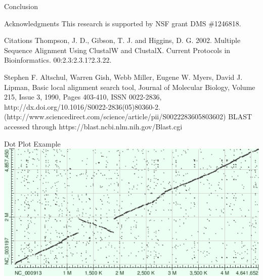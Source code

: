 \documentclass[final]{beamer}
\begin{document}
\begin{frame}{}
\begin{columns}[t]
\begin{column}{.32 \linewidth}
\begin{block}{\large Conclusion}
\end{block}


	
	  \begin{block}{Acknowledgments}
This research is supported by NSF grant DMS \#1246818.
	 \end{block}
\begin{block}{Citations}
	\footnotesize
Thompson, J. D., Gibson, T. J. and Higgins, D. G. 2002. Multiple Sequence Alignment Using ClustalW and ClustalX. Current Protocols in Bioinformatics. 00:2.3:2.3.1?2.3.22.

Stephen F. Altschul, Warren Gish, Webb Miller, Eugene W. Myers, David J. Lipman, Basic local alignment search tool, Journal of Molecular Biology, Volume 215, Issue 3, 1990, Pages 403-410, ISSN 0022-2836, http://dx.doi.org/10.1016/S0022-2836(05)80360-2.
(http://www.sciencedirect.com/science/article/pii/S0022283605803602)
BLAST accessed through https://blast.ncbi.nlm.nih.gov/Blast.cgi

\end{block}
\begin{block}{Dot Plot Example}
\includegraphics[scale = 1.25]{hit_matrixECSal.png}
\end{block}



        \end{column}

    \end{columns}

  \end{frame}
\end{document}
